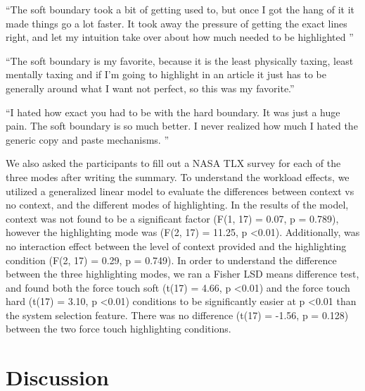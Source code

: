 ``The soft boundary took a bit of getting used to, but once I got the hang of it it made things go a lot faster. It took away the pressure of getting the exact lines right, and let my intuition take over about how much needed to be highlighted ''

``The soft boundary is my favorite, because it is the least physically taxing, least mentally taxing and if I'm going to highlight in an article it just has to be generally around what I want not perfect, so this was my favorite.''

``I hated how exact you had to be with the hard boundary.  It was just a huge pain. The soft boundary is so much better. I never realized how much I hated the generic copy and paste mechanisms. ''

We also asked the participants to fill out a NASA TLX survey for each of the three modes after writing the summary. To understand the workload effects, we utilized a generalized linear model to evaluate the differences between context vs no context, and the different modes of highlighting.  In the results of the model, context was not found to be a significant factor (F(1, 17) = 0.07, p = 0.789), however the highlighting mode was (F(2, 17) = 11.25, p \textless 0.01). Additionally, was no interaction effect between the level of context provided and the highlighting condition (F(2, 17) = 0.29, p = 0.749). In order to understand the difference between the three highlighting modes, we ran a Fisher LSD means difference test, and found both the force touch soft (t(17) = 4.66, p \textless 0.01) and the force touch hard (t(17) = 3.10, p \textless 0.01) conditions to be significantly easier at p \textless 0.01 than the system selection feature. There was no difference (t(17) = -1.56, p = 0.128) between the two force touch highlighting conditions. 


%

\section{Discussion}


